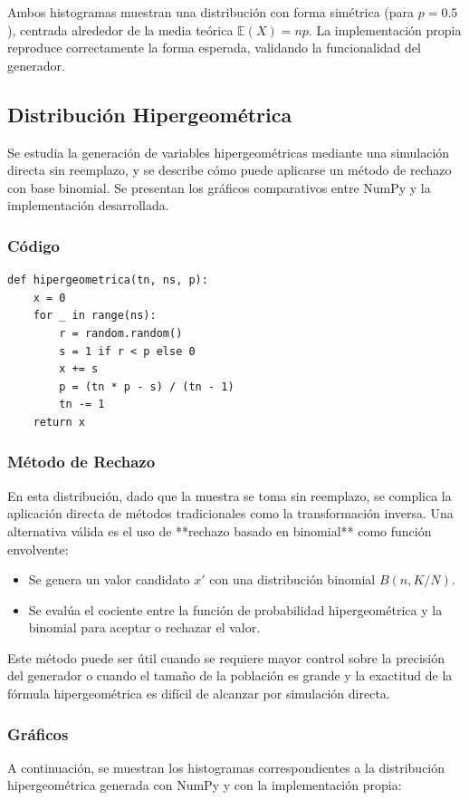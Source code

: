 \documentclass{article}
\begin{document}
Ambos histogramas muestran una distribución con forma simétrica (para $p = 0.5$), centrada alrededor de la media teórica \( \mathbb{E}(X) = np \). La implementación propia reproduce correctamente la forma esperada, validando la funcionalidad del generador.



\subsection{Distribución Hipergeométrica}
Se estudia la generación de variables hipergeométricas mediante una simulación directa sin reemplazo, y se describe cómo puede aplicarse un método de rechazo con base binomial. Se presentan los gráficos comparativos entre NumPy y la implementación desarrollada.

\subsubsection{Código}
\begin{verbatim}
def hipergeometrica(tn, ns, p):
    x = 0
    for _ in range(ns):
        r = random.random()
        s = 1 if r < p else 0
        x += s
        p = (tn * p - s) / (tn - 1)
        tn -= 1
    return x
\end{verbatim}

\subsubsection{Método de Rechazo}
En esta distribución, dado que la muestra se toma sin reemplazo, se complica la aplicación directa de métodos tradicionales como la transformación inversa. Una alternativa válida es el uso de **rechazo basado en binomial** como función envolvente:

\begin{itemize}
    \item Se genera un valor candidato $x'$ con una distribución binomial $B(n, K/N)$.
    \item Se evalúa el cociente entre la función de probabilidad hipergeométrica y la binomial para aceptar o rechazar el valor.
\end{itemize}

Este método puede ser útil cuando se requiere mayor control sobre la precisión del generador o cuando el tamaño de la población es grande y la exactitud de la fórmula hipergeométrica es difícil de alcanzar por simulación directa.

\subsubsection{Gráficos}
A continuación, se muestran los histogramas correspondientes a la distribución hipergeométrica generada con NumPy y con la implementación propia:
\end{document}
